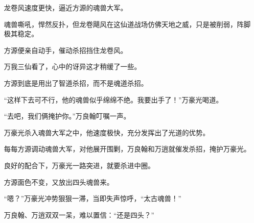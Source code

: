 \begin{this_body}
龙卷风速度更快，逼近方源的魂兽大军。

魂兽嘶吼，悍然反扑，但龙卷飓风在这仙道战场仿佛天地之威，只是被削弱，阵脚极其稳定。

方源便亲自动手，催动杀招挡住龙卷风。

万我三仙看了，心中的讶异这才稍缓了一些。

方源到底是用出了智道杀招，而不是魂道杀招。

“这样下去可不行，他的魂兽似乎绵绵不绝。我要出手了！”万豪光喝道。

“去吧，我们俩掩护你。”万良翰叮嘱一声。

万豪光杀入魂兽大军之中，他速度极快，充分发挥出了光道的优势。

每每方源调动魂兽大军，对他展开围剿，万良翰和万逍就催发杀招，掩护万豪光。

良好的配合下，万豪光一路突进，就要杀进中圈。

方源面色不变，又放出四头魂兽来。

“嗯？”万豪光冲势狠狠一滞，当即失声惊呼，“太古魂兽！”

万良翰、万逍双双一呆，难以置信：“还是四头？”

\end{this_body}


